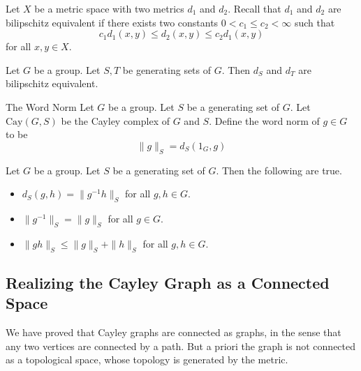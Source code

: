 \documentclass[a4paper]{article}
\begin{document}
Let $X$ be a metric space with two metrics $d_1$ and $d_2$. Recall that $d_1$ and $d_2$ are bilipschitz equivalent if there exists two constants $0<c_1\leq c_2<\infty$ such that $$c_1d_1(x,y)\leq d_2(x,y)\leq c_2d_1(x,y)$$ for all $x,y\in X$. 

\begin{lmm}{}{} Let $G$ be a group. Let $S,T$ be generating sets of $G$. Then $d_S$ and $d_T$ are bilipschitz equivalent. 
\end{lmm}

\begin{defn}{The Word Norm}{} Let $G$ be a group. Let $S$ be a generating set of $G$. Let $\text{Cay}(G,S)$ be the Cayley complex of $G$ and $S$. Define the word norm of $g\in G$ to be $$\|g\|_S=d_S(1_G,g)$$
\end{defn}

\begin{lmm}{}{} Let $G$ be a group. Let $S$ be a generating set of $G$. Then the following are true. 
\begin{itemize}
\item $d_S(g,h)=\|g^{-1}h\|_S$ for all $g,h\in G$. 
\item $\|g^{-1}\|_S=\|g\|_S$ for all $g\in G$. 
\item $\|gh\|_S\leq\|g\|_S+\|h\|_S$ for all $g,h\in G$. 
\end{itemize}
\end{lmm}

\subsection{Realizing the Cayley Graph as a Connected Space}
We have proved that Cayley graphs are connected as graphs, in the sense that any two vertices are connected by a path. But a priori the graph is not connected as a topological space, whose topology is generated by the metric. 
\end{document}
